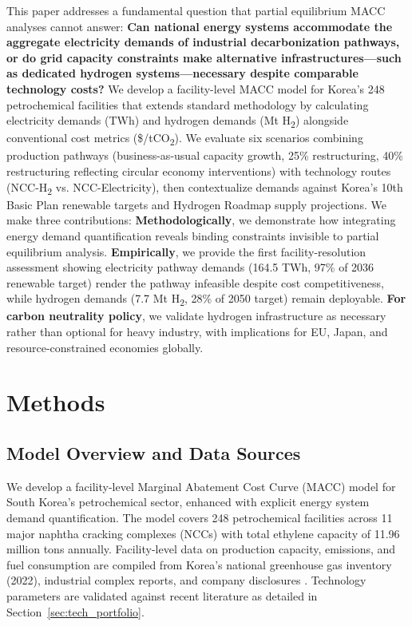 \documentclass[11pt,a4paper]{article}
\begin{document}
This paper addresses a fundamental question that partial equilibrium MACC analyses cannot answer: \textbf{Can national energy systems accommodate the aggregate electricity demands of industrial decarbonization pathways, or do grid capacity constraints make alternative infrastructures---such as dedicated hydrogen systems---necessary despite comparable technology costs?} We develop a facility-level MACC model for Korea's 248 petrochemical facilities that extends standard methodology by calculating electricity demands (TWh) and hydrogen demands (Mt H\textsubscript{2}) alongside conventional cost metrics (\$/tCO\textsubscript{2}). We evaluate six scenarios combining production pathways (business-as-usual capacity growth, 25\% restructuring, 40\% restructuring reflecting circular economy interventions) with technology routes (NCC-H\textsubscript{2} vs. NCC-Electricity), then contextualize demands against Korea's 10th Basic Plan renewable targets and Hydrogen Roadmap supply projections. We make three contributions: \textbf{Methodologically}, we demonstrate how integrating energy demand quantification reveals binding constraints invisible to partial equilibrium analysis. \textbf{Empirically}, we provide the first facility-resolution assessment showing electricity pathway demands (164.5 TWh, 97\% of 2036 renewable target) render the pathway infeasible despite cost competitiveness, while hydrogen demands (7.7 Mt H\textsubscript{2}, 28\% of 2050 target) remain deployable. \textbf{For carbon neutrality policy}, we validate hydrogen infrastructure as necessary rather than optional for heavy industry, with implications for EU, Japan, and resource-constrained economies globally.

\section{Methods}

\subsection{Model Overview and Data Sources}

We develop a facility-level Marginal Abatement Cost Curve (MACC) model for South Korea's petrochemical sector, enhanced with explicit energy system demand quantification. The model covers 248 petrochemical facilities across 11 major naphtha cracking complexes (NCCs) with total ethylene capacity of 11.96 million tons annually. Facility-level data on production capacity, emissions, and fuel consumption are compiled from Korea's national greenhouse gas inventory (2022), industrial complex reports, and company disclosures \citep{GESI2024,InvestKorea2023}. Technology parameters are validated against recent literature \citep{Chen2024,Gupta2023,Park2022,Smith2024,Jones2023,Zhang2022} as detailed in Section~\ref{sec:tech_portfolio}.
\end{document}
